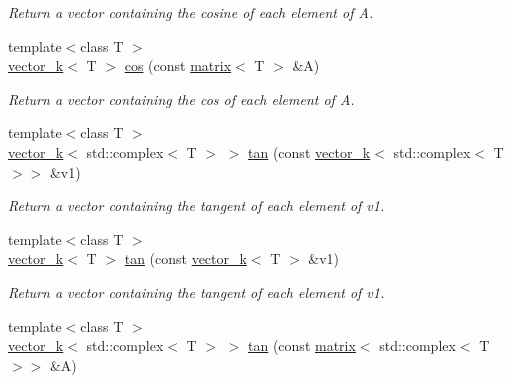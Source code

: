 \begin{DoxyCompactItemize}
\begin{DoxyCompactList}\small\item\em Return a vector containing the cosine of each element of A. \end{DoxyCompactList}\item 
\hypertarget{namespacekeycpp_af8995aedb4c636b77717bb09b37487be}{{\footnotesize template$<$class T $>$ }\\\hyperlink{classkeycpp_1_1vector__k}{vector\-\_\-k}$<$ T $>$ \hyperlink{namespacekeycpp_af8995aedb4c636b77717bb09b37487be}{cos} (const \hyperlink{classkeycpp_1_1matrix}{matrix}$<$ T $>$ \&A)}\label{namespacekeycpp_af8995aedb4c636b77717bb09b37487be}

\begin{DoxyCompactList}\small\item\em Return a vector containing the cos of each element of A. \end{DoxyCompactList}\item 
\hypertarget{namespacekeycpp_a25563b8ed483cdd3bbbaf647beb76ba8}{{\footnotesize template$<$class T $>$ }\\\hyperlink{classkeycpp_1_1vector__k}{vector\-\_\-k}$<$ std\-::complex$<$ T $>$ $>$ \hyperlink{namespacekeycpp_a25563b8ed483cdd3bbbaf647beb76ba8}{tan} (const \hyperlink{classkeycpp_1_1vector__k}{vector\-\_\-k}$<$ std\-::complex$<$ T $>$$>$ \&v1)}\label{namespacekeycpp_a25563b8ed483cdd3bbbaf647beb76ba8}

\begin{DoxyCompactList}\small\item\em Return a vector containing the tangent of each element of v1. \end{DoxyCompactList}\item 
\hypertarget{namespacekeycpp_a90f340395d16b059204d507250945f35}{{\footnotesize template$<$class T $>$ }\\\hyperlink{classkeycpp_1_1vector__k}{vector\-\_\-k}$<$ T $>$ \hyperlink{namespacekeycpp_a90f340395d16b059204d507250945f35}{tan} (const \hyperlink{classkeycpp_1_1vector__k}{vector\-\_\-k}$<$ T $>$ \&v1)}\label{namespacekeycpp_a90f340395d16b059204d507250945f35}

\begin{DoxyCompactList}\small\item\em Return a vector containing the tangent of each element of v1. \end{DoxyCompactList}\item 
\hypertarget{namespacekeycpp_abae345d963258d8db3de7630a21f7231}{{\footnotesize template$<$class T $>$ }\\\hyperlink{classkeycpp_1_1vector__k}{vector\-\_\-k}$<$ std\-::complex$<$ T $>$ $>$ \hyperlink{namespacekeycpp_abae345d963258d8db3de7630a21f7231}{tan} (const \hyperlink{classkeycpp_1_1matrix}{matrix}$<$ std\-::complex$<$ T $>$$>$ \&A)}\label{namespacekeycpp_abae345d963258d8db3de7630a21f7231}


\end{DoxyCompactItemize}
